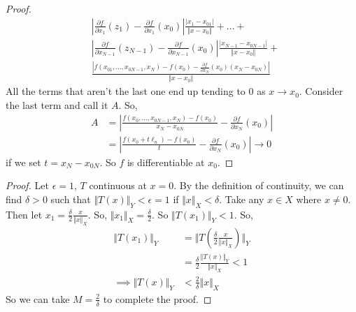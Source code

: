 \documentclass{report}
\begin{document}
\begin{proof}
\begin{align*}
        &\left| \frac{\partial f}{\partial x_1} (z_1)- \frac{\partial f}{\partial x_1}(x_0)\right| \frac{|x_1 - x_{01}|}{\Vert x - x_0 \Vert} + \ldots + \\
        &\left| \frac{\partial f}{\partial x_{N-1}} (z_{N-1})- \frac{\partial f}{\partial x_{N-1}}(x_0)\right| \frac{|x_{N-1} - x_{0N-1}|}{\Vert x - x_0 \Vert} + \\
        &\frac{|f(x_{01}, \ldots, x_{0N-1}, x_N) - f(x_0) - \frac{\partial f}{\partial x_N}(x_0)(x_N - x_{0N})|}{\Vert x - x_0 \Vert}
    \end{align*}
    All the terms that aren't the last one end up tending to 0 as $x \to x_0$. Consider the last term and call it $A$. So,
    \begin{align*}
        A &= \left| \frac{ f(x_0, \ldots, x_{0N-1}, x_N) - f(x_0) }{x_N - x_{0N}} - \frac{\partial f}{\partial x_N}(x_0) \right| \\
        &= \left| \frac{f(x_0 + t \ell_n) - f(x_0)}{t} - \frac{\partial f}{\partial x_N}(x_0) \right| \to 0
    \end{align*}
    if we set $t = x_N - x_{0N}$. So $f$ is differentiable at $x_0$.
\end{proof}
\newpage
{}
\begin{proof}
    Let $\epsilon = 1$, $T$ continuous at $x=0$. By the definition of continuity, we can find $\delta > 0$ such that $\Vert T(x) \Vert_Y < \epsilon = 1$ if $\Vert x \Vert_X < \delta$. Take any $x \in X$ where $x \neq 0$. Then let $x_1 = \frac{\delta}{2} \frac{x}{\Vert x\Vert_X}$. So, $\Vert x_1 \Vert_X = \frac{\delta}{2}$. So $\Vert T(x_1) \Vert_Y < 1$. So,
    \begin{align*}
        \Vert T(x_1) \Vert_Y &= \Vert T\left( \frac{\delta}{2} \frac{x}{\Vert x\Vert_X} \right) \Vert_Y \\
        &= \frac{\delta}{2} \frac{\Vert T(x) \Vert_Y}{\Vert x \Vert_X} < 1 \\
        \implies \Vert T(x) \Vert_Y &< \frac{2}{\delta} \Vert x \Vert_X
    \end{align*}
    So we can take $M = \frac{2}{\delta}$ to complete the proof.
\end{proof}
\end{document}
